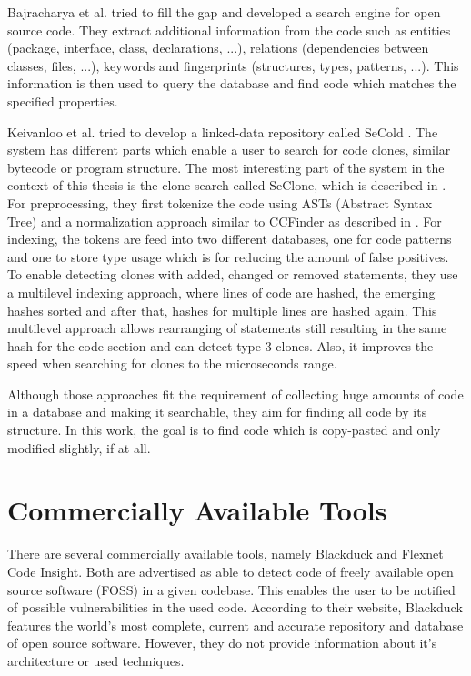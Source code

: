 Bajracharya et al. tried to fill the gap and developed a search engine for open source code.
They extract additional information from the code such as entities (package, interface, class, declarations, ...), relations (dependencies between classes, files, ...), keywords and fingerprints (structures, types, patterns, ...).
This information is then used to query the database and find code which matches the specified properties.

Keivanloo et al. tried to develop a linked-data repository called SeCold \cite{keivanloo2012leveraging,keivanloo2011internet,keivanloo2011seclone,keivanloo2010semantic}.
The system has different parts which enable a user to search for code clones, similar bytecode or program structure.
The most interesting part of the system in the context of this thesis is the clone search called SeClone, which is described in \cite{keivanloo2011internet,keivanloo2011seclone}.
For preprocessing, they first tokenize the code using ASTs (Abstract Syntax Tree) and a normalization approach similar to CCFinder as described in \cite{kamiya2002ccfinder}.
For indexing, the tokens are feed into two different databases, one for code patterns and one to store type usage which is for reducing the amount of false positives.
To enable detecting clones with added, changed or removed statements, they use a multilevel indexing approach, where lines of code are hashed, the emerging hashes sorted and after that, hashes for multiple lines are hashed again.
This multilevel approach allows rearranging of statements still resulting in the same hash for the code section and can detect type 3 clones.
Also, it improves the speed when searching for clones to the microseconds range.

Although those approaches fit the requirement of collecting huge amounts of code in a database and making it searchable, they aim for finding all code by its structure.
In this work, the goal is to find code which is copy-pasted and only modified slightly, if at all.

\section{Commercially Available Tools}
There are several commercially available tools, namely Blackduck and Flexnet Code Insight.
Both are advertised as able to detect code of freely available open source software (FOSS) in a given codebase.
This enables the user to be notified of possible vulnerabilities in the used code.
According to their website, Blackduck features \glqq the world’s most complete, current and accurate repository and database of open source software\grqq\cite{blackduck}.
However, they do not provide information about it's architecture or used techniques.


